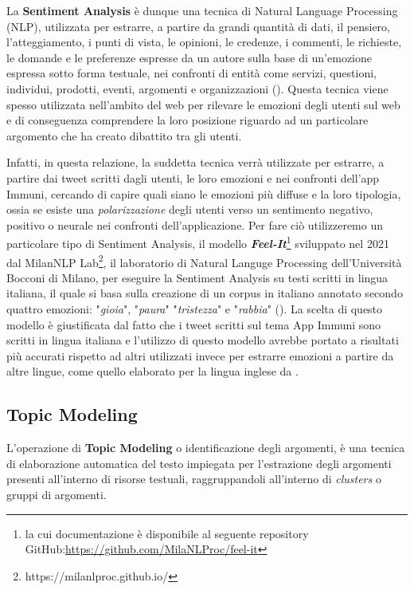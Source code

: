 La \textbf{Sentiment Analysis} è dunque una tecnica di Natural Language Processing (NLP), utilizzata per estrarre, a partire da grandi quantità di dati, il pensiero, l'atteggiamento, i punti di vista, le opinioni, le credenze, i commenti, le richieste, le domande e le preferenze espresse da un autore sulla base di un'emozione espressa sotto forma testuale, nei confronti di entità come servizi, questioni, individui, prodotti, eventi, argomenti e organizzazioni (\cite{lamba_sentiment_2022}).
Questa tecnica viene spesso utilizzata nell'ambito del web per rilevare le emozioni degli utenti sul web e di conseguenza comprendere la loro posizione riguardo ad un particolare argomento che ha creato dibattito tra gli utenti.

Infatti, in questa relazione, la suddetta tecnica verrà utilizzate per estrarre, a partire dai tweet scritti dagli utenti, le loro emozioni e nei confronti dell'app Immuni, cercando di capire quali siano le emozioni più diffuse e la loro tipologia, ossia se esiste una \textit{polarizzazione} degli utenti verso un sentimento negativo, positivo o neurale nei confronti dell'applicazione.
Per fare ciò utilizzeremo un particolare tipo di Sentiment Analysis, il modello \textbf{\textit{Feel-It}}\footnote{la cui documentazione è disponibile al seguente repository GitHub:\url{https://github.com/MilaNLProc/feel-it}} sviluppato nel 2021 dal MilanNLP Lab\footnote{https://milanlproc.github.io/}, il laboratorio di Natural Languge Processing dell'Università Bocconi di Milano, per eseguire la Sentiment Analysis su testi scritti in lingua italiana, il quale si basa sulla creazione di un corpus in italiano annotato secondo quattro emozioni: "\textit{gioia}", "\textit{paura}" "\textit{tristezza}" e "\textit{rabbia}" (\cite{bianchi_feel-it_2021}).
La scelta di questo modello è giustificata dal fatto che i tweet scritti sul tema App Immuni sono scritti in lingua italiana e l'utilizzo di questo modello avrebbe portato a risultati più accurati rispetto ad altri utilizzati invece per estrarre emozioni a partire da altre lingue, come quello elaborato per la lingua inglese da \cite{abdul-mageed-ungar-2017-emonet}.


 
\subsection{Topic Modeling} \label{sec:TopicModeling}
L'operazione di \textbf{Topic Modeling} o identificazione degli argomenti, è una tecnica di elaborazione automatica del testo impiegata per l'estrazione degli argomenti presenti all'interno di risorse testuali, raggruppandoli all'interno di \textit{clusters} o gruppi di argomenti.

